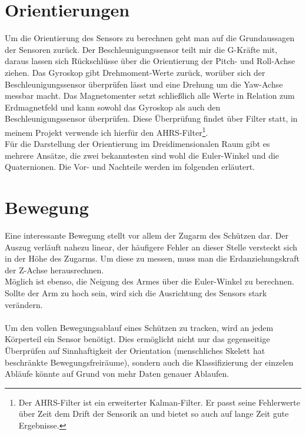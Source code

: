 \section{Orientierungen}
Um die Orientierung des Sensors zu berechnen geht man auf die Grundaussagen der Sensoren zurück. Der 
Beschleunigungssensor teilt mir die G-Kräfte mit, daraus lassen sich Rückschlüsse über die Orientierung 
der Pitch- und Roll-Achse ziehen. Das Gyroskop gibt Drehmoment-Werte zurück, worüber sich der Beschleunigungssensor
überprüfen lässt und eine Drehung um die Yaw-Achse messbar macht. Das Magnetomenter setzt schließlich alle Werte in
Relation zum Erdmagnetfeld und kann sowohl das Gyroskop als auch den Beschleunigungssensor überprüfen. Diese Überprüfung
findet über Filter statt, in meinem Projekt verwende ich hierfür den AHRS-Filter\footnote{Der AHRS-Filter 
ist ein erweiterter Kalman-Filter. Er passt seine Fehlerwerte über Zeit dem Drift der Sensorik an und bietet so auch 
auf lange Zeit gute Ergebnisse.}. \\
Für die Darstellung der Orientierung im Dreidimensionalen Raum gibt es mehrere Ansätze, die zwei bekanntesten 
sind wohl die Euler-Winkel und die Quaternionen. Die Vor- und Nachteile werden im folgenden erläutert.



\section {Bewegung}
Eine interessante Bewegung stellt vor allem der Zugarm des 
Schützen dar. Der Auszug verläuft nahezu linear, der häufigere Fehler 
an dieser Stelle versteckt sich in der Höhe des Zugarms. 
Um diese zu messen, muss man die Erdanziehungskraft der Z-Achse herausrechnen.\\
Möglich ist ebenso, die Neigung des Armes über die Euler-Winkel zu berechnen. Sollte 
der Arm zu hoch sein, wird sich die Ausrichtung des Sensors stark verändern.\\
\\
Um den vollen Bewegungsablauf eines Schützen zu tracken, wird an jedem Körperteil ein Sensor
benötigt. Dies ermöglicht nicht nur das gegenseitige Überprüfen auf Sinnhaftigkeit der Orientation
(menschliches Skelett hat beschränkte Bewegungsfreiräume), sondern auch die Klassifizierung der 
einzelen Abläufe könnte auf Grund von mehr Daten genauer Ablaufen.